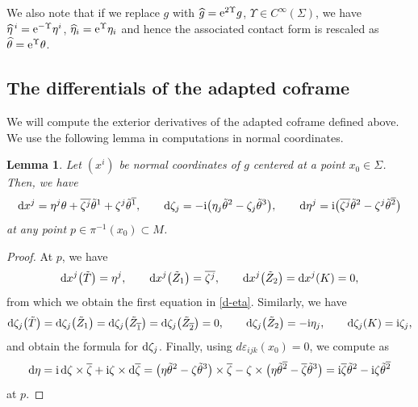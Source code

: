 \documentclass[pdftex]{sigma}
\newcommand\e{\varepsilon}
\renewcommand\th{\theta}
\newcommand\ol{\overline}
\newcommand{\wh}{\widehat}
\numberwithin{equation}{section}
\newtheorem{Lemma}[Theorem]{Lemma}
\begin{document}
We also note that if we replace $g$ with $\wh g={\rm e}^{2\Upsilon} g$, $\Upsilon\in C^\infty(\Sigma)$, we have $\wh\eta^{\,i}={\rm e}^{-\Upsilon}\eta^i$, $\wh\eta_i={\rm e}^{\Upsilon}\eta_i$ and hence the associated contact form is rescaled as $\wh\th={\rm e}^{\Upsilon}\th$.


\subsection{The differentials of the adapted coframe}
We will compute the exterior derivatives of the adapted coframe defined above.
We use the following lemma in computations in normal coordinates.
\begin{Lemma}
Let $(x^i)$ be normal coordinates of $g$ centered at a point $x_0\in\Sigma$. Then, we have
\begin{equation}\label{d-eta}
{\rm d}x^j=\eta^j\theta+\ol{\zeta^j}\tilde\theta^1+\zeta^j\tilde\theta^{\ol1}, \qquad
{\rm d}\zeta_j=-{\rm i}\bigl(\eta_j\tilde\theta^2-\zeta_j\tilde\theta^3\bigr), \qquad
{\rm d}\eta^j={\rm i}\bigl(\ol{\zeta^j}\tilde\theta^2-\zeta^j\tilde\theta^{\ol2}\bigr)
\end{equation}
at any point $p\in \pi^{-1}(x_0)\subset M$.
\end{Lemma}
\begin{proof}
At $p$, we have
\[
{\rm d}x^j\bigl(\tilde T\bigr)=\eta^j, \qquad {\rm d}x^j\bigl(\tilde Z_1\bigr)=\ol{\zeta^j},\qquad {\rm d}x^j\bigl(\tilde Z_2\bigr)={\rm d}x^j(K)=0,
\]
from which we obtain the first equation in \eqref{d-eta}. Similarly, we have
\[
{\rm d}\zeta_j\bigl(\tilde T\bigr)={\rm d}\zeta_j\bigl(\tilde Z_{1}\bigr)={\rm d}\zeta_j\bigl(\tilde Z_{\ol1}\bigr)={\rm d}\zeta_j\bigl(\tilde Z_{\ol2}\bigr)=0, \qquad
{\rm d}\zeta_j\bigl(\tilde Z_2\bigr)=-{\rm i}\eta_j, \qquad
{\rm d}\zeta_j(K)={\rm i}\zeta_j,
\]
and obtain the formula for ${\rm d}\zeta_j$. Finally, using $d\e_{ijk}(x_0)=0$, we compute as
 \[
{\rm d}\eta={\rm i}\,{\rm d}\zeta\times \ol\zeta+{\rm i}\zeta\times {\rm d}\ol\zeta
=\bigl(\eta\tilde\theta^2-\zeta\tilde\theta^3\bigr)\times\ol\zeta-\zeta\times\bigl(\eta\tilde\theta^{\ol2}-\ol\zeta\tilde\theta^3\bigr)={\rm i}\ol\zeta\tilde\theta^2-{\rm i}\zeta\tilde\theta^{\ol2}
\]
at $p$.
\end{proof}
\end{document}
